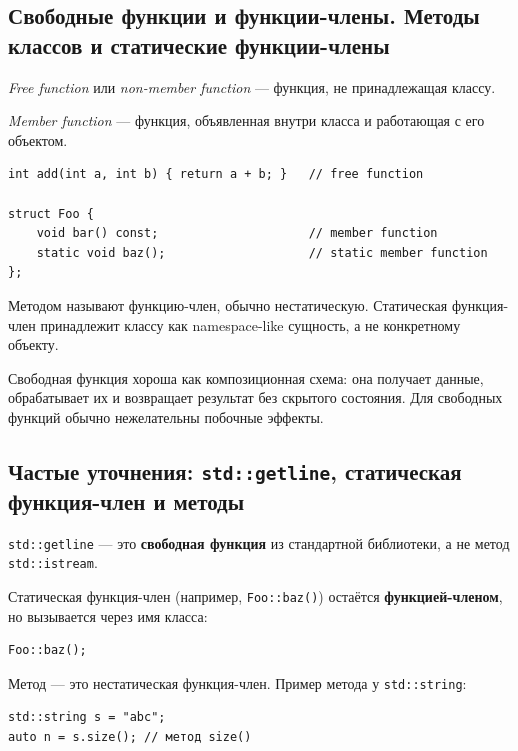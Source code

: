 \subsection{Свободные функции и функции-члены. Методы классов и статические функции-члены}
\begin{definition}
\textit{Free function} или \textit{non-member function} — функция, не принадлежащая классу.
\end{definition}

\begin{definition}
\textit{Member function} — функция, объявленная внутри класса и работающая с его объектом.
\end{definition}

\begin{example}
\begin{verbatim}
int add(int a, int b) { return a + b; }   // free function

struct Foo {
    void bar() const;                     // member function
    static void baz();                    // static member function
};
\end{verbatim}
\end{example}

Методом называют функцию-член, обычно нестатическую.  
Статическая функция-член принадлежит классу как namespace-like сущность, а не конкретному объекту.

\begin{remark}
Свободная функция хороша как композиционная схема: она получает данные, обрабатывает их и возвращает результат без скрытого состояния. Для свободных функций обычно нежелательны побочные эффекты.
\end{remark}

\subsection{Частые уточнения: \texttt{std::getline}, статическая функция-член и методы}
\texttt{std::getline} — это \textbf{свободная функция} из стандартной библиотеки, а не метод \texttt{std::istream}.

Статическая функция-член (например, \texttt{Foo::baz()}) остаётся \textbf{функцией-членом}, но вызывается через имя класса:
\begin{verbatim}
Foo::baz();
\end{verbatim}

Метод — это нестатическая функция-член. Пример метода у \texttt{std::string}:
\begin{verbatim}
std::string s = "abc";
auto n = s.size(); // метод size()
\end{verbatim}

